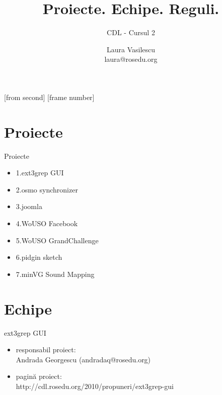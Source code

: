 \documentclass{beamer}
\title{Proiecte. Echipe. Reguli.}
\subtitle{CDL - Cursul 2}
\institute[ROSEdu]{ROSEdu}
\author[Laura]{Laura Vasilescu \\ {\small laura@rosedu.org }}
\begin{document}
[from second]
[frame number]

\frame{\titlepage}

\begin{frame}
\tableofcontents
\end{frame}

\section{Proiecte}


\begin{frame}{Proiecte}
  \begin{itemize} %
  \pause
  \item 1.ext3grep GUI
  \pause
  \item 2.osmo synchronizer
  \pause
  \item 3.joomla 
  \pause
  \item 4.WoUSO Facebook
  \pause
  \item 5.WoUSO GrandChallenge
  \pause
  \item 6.pidgin sketch
  \pause
  \item 7.minVG Sound Mapping
  \end{itemize}
\end{frame}

\section{Echipe}

\begin{frame}{ext3grep GUI}
  \begin{itemize} %
  \pause
  \item responsabil proiect: \\ Andrada Georgescu (andradaq@rosedu.org)
  \pause
  \item pagină proiect: \\ http://cdl.rosedu.org/2010/propuneri/ext3grep-gui
  \end{itemize}
\end{frame}
\end{document}
